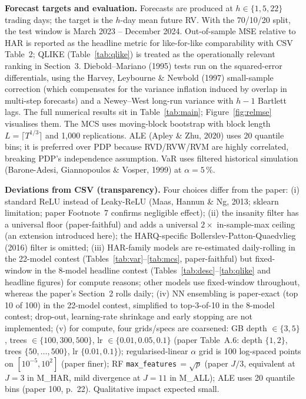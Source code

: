 \documentclass[twocolumn,9pt]{extarticle}
\newcommand{\lead}[1]{\textbf{#1}\hspace{0.25em}\ignorespaces}
\begin{document}
\lead{Forecast targets and evaluation.} Forecasts are produced at
$h\in\{1,5,22\}$ trading days; the target is the $h$-day mean future
RV. With the 70/10/20 split, the test window is March 2023 --
December 2024. Out-of-sample MSE relative to HAR is reported as the
headline metric for like-for-like comparability with CSV Table~2;
QLIKE (Table~\ref{tab:qlike}) is treated as the operationally relevant ranking in
Section~3. Diebold--Mariano (1995) tests run on the squared-error
differentials, using the Harvey, Leybourne \& Newbold (1997)
small-sample correction (which compensates for the variance
inflation induced by overlap in multi-step forecasts) and a
Newey--West long-run variance with $h-1$ Bartlett lags. The full
numerical results sit in Table~\ref{tab:main}; Figure~\ref{fig:relmse}
visualises them. The MCS
uses moving-block bootstrap with block length
$L=\lceil T^{1/3}\rceil$ and 1{,}000 replications. ALE (Apley \&
Zhu, 2020) uses 20 quantile bins; it is preferred over PDP because
RVD/RVW/RVM are highly correlated, breaking PDP's independence
assumption. VaR uses filtered historical simulation (Barone-Adesi,
Giannopoulos \& Vosper, 1999) at $\alpha=5\,\%$.

\lead{Deviations from CSV (transparency).} Four choices differ from
the paper: (i) standard ReLU instead of Leaky-ReLU (Maas, Hannun \&
Ng, 2013; sklearn limitation; paper Footnote~7 confirms negligible
effect); (ii) the insanity filter has a universal floor
(paper-faithful) and adds a universal $2\times$ in-sample-max
ceiling (an extension introduced here); the HARQ-specific
Bollerslev-Patton-Quaedvlieg (2016) filter is omitted; (iii)
HAR-family models are re-estimated daily-rolling in the 22-model
contest (Tables~\ref{tab:var}--\ref{tab:mcs}, paper-faithful) but fixed-window in the
8-model headline contest (Tables~\ref{tab:desc}--\ref{tab:qlike} and headline figures) for compute
reasons; other models use fixed-window throughout, whereas the
paper's Section~2 rolls daily; (iv) NN ensembling is paper-exact
(top 10 of 100) in the 22-model contest, simplified to top-3-of-10
in the 8-model contest; drop-out, learning-rate shrinkage and early
stopping are not implemented; (v) for compute, four grids/specs are
coarsened: GB depth $\in\{3,5\}$, trees $\in\{100,300,500\}$,
lr $\in\{0.01,0.05,0.1\}$ (paper Table~A.6: depth $\{1,2\}$, trees
$\{50,\dots,500\}$, lr $\{0.01,0.1\}$); regularised-linear $\alpha$
grid is 100 log-spaced points on $[10^{-5},10^{2}]$ (paper finer);
RF \texttt{max\_features}\,$=\sqrt{p}$ (paper $J/3$, equivalent at
$J=3$ in M\_HAR, mild divergence at $J=11$ in M\_ALL); ALE uses 20
quantile bins (paper 100, p.~22). Qualitative impact expected small.
\end{document}
